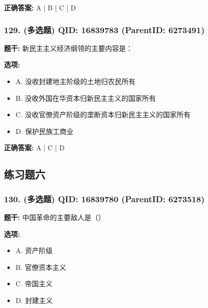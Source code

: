 \documentclass[12pt,UTF8]{ctexart}
\begin{document}
\textbf{正确答案:}
A | B | C | D

\vspace{0.3em}\hrulefill\vspace{0.7em}

\subsubsection*{129. (多选题) \small QID: 16839783 (ParentID: 6273491)}

\textbf{题干:}
新民主主义经济纲领的主要内容是：



\textbf{选项:}
\begin{itemize}[leftmargin=*]

  \item A. 没收封建地主阶级的土地归农民所有

  \item B. 没收外国在华资本归新民主主义的国家所有

  \item C. 没收官僚资产阶级的垄断资本归新民主主义的国家所有

  \item D. 保护民族工商业

\end{itemize}

\textbf{正确答案:}
A | C | D

\vspace{0.3em}\hrulefill\vspace{0.7em}

\subsection*{练习题六}

\subsubsection*{130. (多选题) \small QID: 16839780 (ParentID: 6273518)}

\textbf{题干:}
中国革命的主要敌人是（）



\textbf{选项:}
\begin{itemize}[leftmargin=*]

  \item A. 资产阶级

  \item B. 官僚资本主义

  \item C. 帝国主义

  \item D. 封建主义

\end{itemize}
\end{document}
